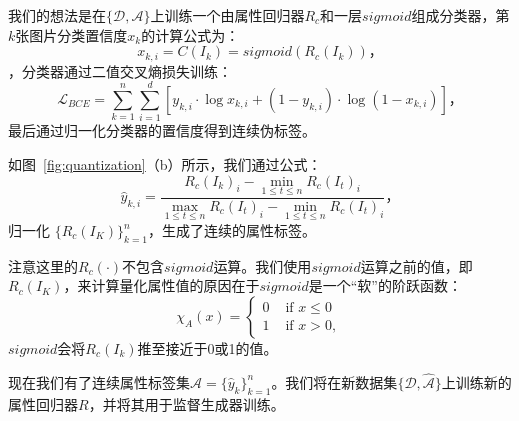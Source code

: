 我们的想法是在$\{\mathcal{D}, \mathcal{A}\}$上训练一个由属性回归器$R_c$和一层$sigmoid$组成分类器，第$k$张图片分类置信度$x_{k}$的计算公式为：
\begin{equation}
     x_{k,i} = C(I_k) = sigmoid(R_c(I_k))，
\end{equation}
，分类器通过二值交叉熵损失训练：
\begin{equation}
     \mathcal{L}_{BCE} = \sum_{k=1}^n \sum_{i=1}^d [y_{k,i} \cdot \log x_{k,i}+\left(1-y_{k,i}\right) \cdot \log \left(1-x_{k,i}\right)]，
\end{equation}
最后通过归一化分类器的置信度得到连续伪标签。

如图~\ref{fig:quantization}（b）所示，我们通过公式：
\begin{equation}
     \hat{y}_{k,i} = \frac{R_c(I_k)_i - \min \limits_{1 \leq t \leq n}R_c(I_t)_i}{\max \limits_{1 \leq t \leq n}R_c(I_t)_i - \min \limits_{1 \leq t \leq n}R_c(I_t)_i}，
     \label{eq3}
\end{equation}
归一化 $\{R_c(I_K)\}_{k=1}^n$，生成了连续的属性标签。

注意这里的$R_c(\cdot)$不包含$sigmoid$运算。我们使用$sigmoid$运算之前的值，即$R_c(I_K)$，来计算量化属性值的原因在于$sigmoid$是一个“软”的阶跃函数：
\begin{equation}
   \chi_{A}(x)=\left\{\begin{array}{ll}
      0 & \text { if } x \leq 0 \\
      1 & \text { if } x > 0,
      \end{array}\right.
\end{equation}
$sigmoid$会将$R_c(I_k)$推至接近于0或1的值。

现在我们有了连续属性标签集$\hat{\mathcal{A}}=\{\hat{y}_k\}_{k=1}^n$。我们将在新数据集$\{\mathcal{D}, \hat{\mathcal{A}}\}$上训练新的属性回归器$R$，并将其用于监督生成器训练。


